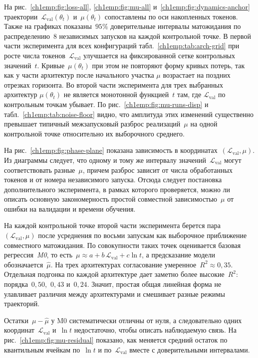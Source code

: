 На рис.~\ref{ch1emp:fig:loss-all}, \ref{ch1emp:fig:mu-all} и~\ref{ch1emp:fig:dynamics-anchor} траектории~$\mathcal{L}_{\mathrm{val}}(\theta_t)$ и~$\mu(\theta_t)$ сопоставлены по оси накопленных токенов.
Также на графиках показаны~$95\%$ доверительные интервалы матожидания по распределению~$8$ независимых запусков на каждой контрольной точке.
В первой части эксперимента для всех конфигураций табл.~\ref{ch1emp:tab:arch-grid} при росте числа токенов~$\mathcal{L}_{\mathrm{val}}$ улучшается на фиксированной сетке контрольных значений~$t$.
Кривые~$\mu(\theta_t)$ при этом не повторяют форму кривых потерь, так как у части архитектур после начального участка $\mu$ возрастает на поздних отрезках горизонта.
Во второй части эксперимента для трех выбранных архитектур $\mu(\theta_t)$ не является монотонной функцией~$t$ там, где $\mathcal{L}_{\mathrm{val}}$ по контрольным точкам убывает.
По рис.~\ref{ch1emp:fig:mu-runs-disp} и табл.~\ref{ch1emp:tab:noise-floor} видно, что амплитуда этих изменений существенно превышает типичный межзапусковый разброс реализаций~$\mu$ на одной контрольной точке относительно их выборочного среднего.

На рис.~\ref{ch1emp:fig:phase-plane} показана зависимость в координатах~$(\mathcal{L}_{\mathrm{val}},\mu)$.
Из диаграммы следует, что одному и тому же интервалу значений~$\mathcal{L}_{\mathrm{val}}$ могут соответствовать разные~$\mu$, причем разброс зависит от числа обработанных токенов и от номера независимого запуска.
Отсюда следует постановка дополнительного эксперимента, в рамках которого проверяется, можно ли описать основную закономерность простой совместной зависимостью~$\mu$ от ошибки на валидации и времени обучения.

На каждой контрольной точке второй части эксперимента берется пара~$(\mathcal{L}_{\mathrm{val}},\mu)$ после усреднения по восьми запускам как выборочное приближение совместного матожидания.
По совокупности таких точек оценивается базовая регрессия~\emph{M0}, то есть~$\mu\approx a+b\,\mathcal{L}_{\mathrm{val}}+c\ln t$, а предсказание модели обозначается~$\hat{\mu}$.
На трех архитектурах согласование умеренное~$R^2\approx 0{,}35$.
Отдельная подгонка по каждой архитектуре дает заметно более высокие~$R^2$: порядка~$0{,}50$,~$0{,}43$ и~$0{,}24$.
Значит, простая общая линейная форма не улавливает различия между архитектурами и смешивает разные режимы траекторий.

Остатки~$\mu-\hat{\mu}$ у M0 систематически отличны от нуля, а следовательно одних координат~$\mathcal{L}_{\mathrm{val}}$ и~$\ln t$ недостаточно, чтобы описать наблюдаемую связь.
На рис.~\ref{ch1emp:fig:mu-residual} показано, как меняется средний остаток по квантильным ячейкам по~$\ln t$ и по~$\mathcal{L}_{\mathrm{val}}$ вместе с доверительными интервалами.

